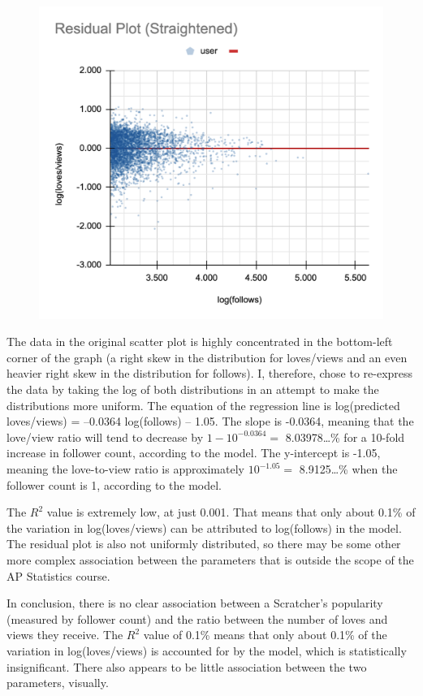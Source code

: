 \documentclass[12pt]{article}
\begin{document}
\begin{flushleft}
	\newpage
	\begin{figure}[h]
		\includegraphics[width=\linewidth]{img/plot3.png}
		\centering
	\end{figure}
	
	\newpage
	The data in the original scatter plot is highly concentrated in the bottom-left corner of the graph (a right skew in the distribution for loves/views and an even heavier right skew in the distribution for follows). I, therefore, chose to re-express the data by taking the log of both distributions in an attempt to make the distributions more uniform. The equation of the regression line is log(predicted loves/views) = –0.0364 log(follows) – 1.05. The slope is -0.0364, meaning that the love/view ratio will tend to decrease by $1-10^{-0.0364}=$ 8.03978…\% for a 10-fold increase in follower count, according to the model. The y-intercept is -1.05, meaning the love-to-view ratio is approximately $10^{-1.05}=$ 8.9125…\% when the follower count is 1, according to the model.
	
	The $R^2$ value is extremely low, at just 0.001. That means that only about 0.1\% of the variation in log(loves/views) can be attributed to log(follows) in the model. The residual plot is also not uniformly distributed, so there may be some other more complex association between the parameters that is outside the scope of the AP Statistics course.
	
	In conclusion, there is no clear association between a Scratcher’s popularity (measured by follower count) and the ratio between the number of loves and views they receive. The $R^2$ value of 0.1\% means that only about 0.1\% of the variation in log(loves/views) is accounted for by the model, which is statistically insignificant. There also appears to be little association between the two parameters, visually.
	
\end{flushleft}
\end{document}
